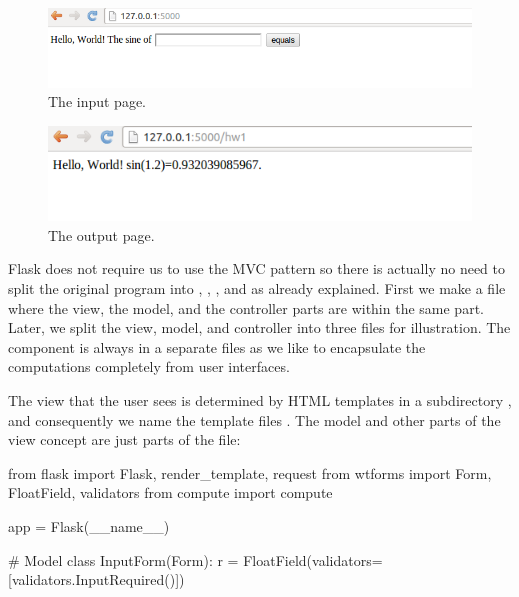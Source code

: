 \documentclass[%
oneside,                 %
final,                   %
10pt]{article}
\begin{document}
\begin{figure}[ht]
  \centerline{\includegraphics[width=0.9\linewidth]{fig-web4sa/hw1_flask_input.png}}
  \caption{
  The input page. \label{wf:hw1:flask:fig:input}
  }
\end{figure}



\begin{figure}[ht]
  \centerline{\includegraphics[width=0.9\linewidth]{fig-web4sa/hw1_flask_output.png}}
  \caption{
  The output page. \label{wf:hw1:flask:fig:result}
  }
\end{figure}




Flask does not require us to use the MVC pattern so there is actually
no need to split the original program into , ,
, and  as already explained.  First we make
a  file where the view, the model, and the controller
parts are within the same part. Later, we split the view, model, and
controller into three files for illustration. The  component
is always in a separate files as we like to encapsulate the
computations completely from user interfaces.


The view that the user sees is determined by
HTML templates in a subdirectory , and consequently
we name the template files .
The model and other parts of the view concept are just parts of
the  file:

\bpypro
from flask import Flask, render_template, request
from wtforms import Form, FloatField, validators
from compute import compute

app = Flask(__name__)

# Model
class InputForm(Form):
    r = FloatField(validators=[validators.InputRequired()])
\end{document}
